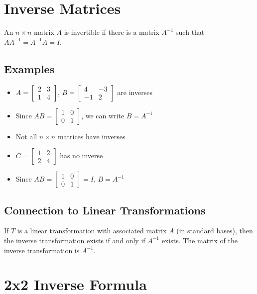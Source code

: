 \documentclass[11pt,a4paper]{article}
\begin{document}
\section{Inverse Matrices}

An $n\times n$ matrix $A$ is invertible if there is a matrix $A^{-1}$ such that $AA^{-1} = A^{-1}A = I$.

\subsection{Examples}

\begin{itemize}
    \item $A = \begin{bmatrix} 2 & 3 \\ 1 & 4 \end{bmatrix}$, $B = \begin{bmatrix} 4 & -3 \\ -1 & 2 \end{bmatrix}$ are inverses
    \item Since $AB = \begin{bmatrix} 1 & 0 \\ 0 & 1 \end{bmatrix}$, we can write $B = A^{-1}$
    \item Not all $n\times n$ matrices have inverses
    \item $C = \begin{bmatrix} 1 & 2 \\ 2 & 4 \end{bmatrix}$ has no inverse
    \item Since $AB = \begin{bmatrix} 1 & 0 \\ 0 & 1 \end{bmatrix} = I$, $B = A^{-1}$
\end{itemize}

\subsection{Connection to Linear Transformations}

If $T$ is a linear transformation with associated matrix $A$ (in standard bases), then the inverse transformation exists if and only if $A^{-1}$ exists. The matrix of the inverse transformation is $A^{-1}$.

\section{2x2 Inverse Formula}
\end{document}
